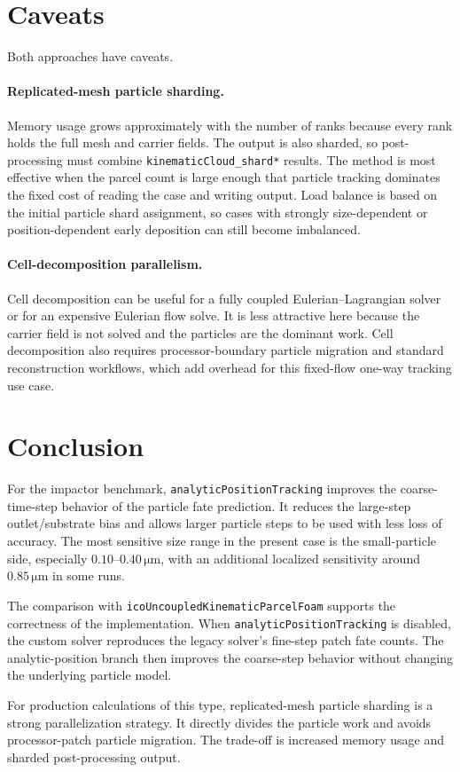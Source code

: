 \documentclass[11pt]{article}
\begin{document}
\section{Caveats}

Both approaches have caveats.

\paragraph{Replicated-mesh particle sharding.}
Memory usage grows approximately with the number of ranks because every rank
holds the full mesh and carrier fields.  The output is also sharded, so
post-processing must combine \texttt{kinematicCloud\_shard*} results.  The
method is most effective when the parcel count is large enough that particle
tracking dominates the fixed cost of reading the case and writing output.
Load balance is based on the initial particle shard assignment, so cases with
strongly size-dependent or position-dependent early deposition can still become
imbalanced.

\paragraph{Cell-decomposition parallelism.}
Cell decomposition can be useful for a fully coupled Eulerian--Lagrangian
solver or for an expensive Eulerian flow solve.  It is less attractive here
because the carrier field is not solved and the particles are the dominant
work.  Cell decomposition also requires processor-boundary particle migration
and standard reconstruction workflows, which add overhead for this fixed-flow
one-way tracking use case.

\section{Conclusion}

For the impactor benchmark, \texttt{analyticPositionTracking} improves the
coarse-time-step behavior of the particle fate prediction.  It reduces the
large-step outlet/substrate bias and allows larger particle steps to be used
with less loss of accuracy.  The most sensitive size range in the present case
is the small-particle side, especially \(0.10\)--\(0.40\,\si{\micro\metre}\),
with an additional localized sensitivity around
\(0.85\,\si{\micro\metre}\) in some runs.

The comparison with \texttt{icoUncoupledKinematicParcelFoam} supports the
correctness of the implementation.  When
\texttt{analyticPositionTracking} is disabled, the custom solver reproduces the
legacy solver's fine-step patch fate counts.  The analytic-position branch then
improves the coarse-step behavior without changing the underlying particle
model.

For production calculations of this type, replicated-mesh particle sharding is
a strong parallelization strategy.  It directly divides the particle work and
avoids processor-patch particle migration.  The trade-off is increased memory
usage and sharded post-processing output.
\end{document}
